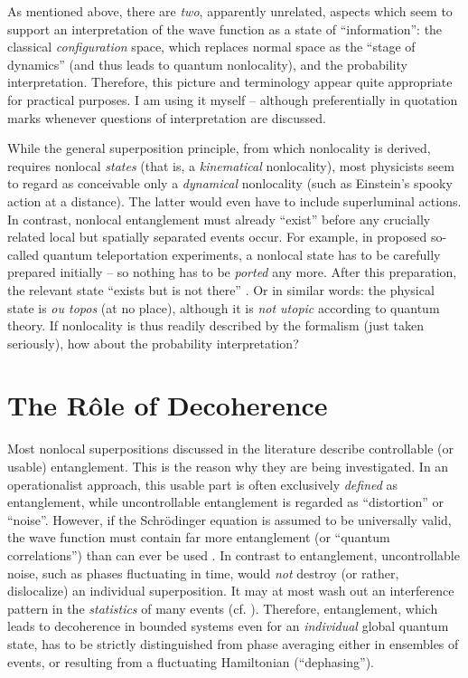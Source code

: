 As mentioned above, there are {\it two}, apparently unrelated, aspects
which seem to support an interpretation of the wave function as a state
of ``information'': the classical {\it configuration} space, which
replaces normal space as the  ``stage of dynamics'' (and
thus leads to quantum nonlocality), and the probability interpretation.
Therefore, this picture and terminology appear quite appropriate for
practical purposes.  I am using it myself -- although preferentially
in quotation marks whenever questions of interpretation are discussed.

While the general superposition principle, from which nonlocality
is derived, requires nonlocal {\it states} (that is, a {\it
kinematical} nonlocality), most physicists seem to regard as
conceivable only a {\it dynamical} nonlocality (such as Einstein's
spooky action at a distance). The latter would even have to include
superluminal actions. In contrast, nonlocal entanglement must already
``exist'' before any crucially related local but spatially separated
events occur. For example, in proposed so-called quantum teleportation
experiments, a nonlocal state has to be carefully prepared initially
-- so nothing has to be {\it ported} any more. After this preparation,
the relevant state ``exists but is not there'' \cite{JZ}. Or in similar
words: the physical state is {\it ou topos} (at no place), although it
is {\it not utopic} according to quantum theory. If nonlocality is thus
readily described by the formalism (just taken
seriously), how about the probability interpretation?

\section{The R\^ole of Decoherence}
Most nonlocal superpositions discussed in the literature
describe controllable (or usable) entanglement. This is the reason why
they are being investigated. In an operationalist approach, this
usable part is often exclusively {\it defined} as entanglement, while
uncontrollable entanglement is regarded as  ``distortion'' or
``noise''. However, if the Schr\"odinger equation is assumed to be
universally valid, the wave function must contain far more
entanglement (or ``quantum correlations'') than can ever be used
\cite{Z1970}. In contrast to entanglement, uncontrollable noise, such
as phases fluctuating in time, would {\it not} destroy (or rather,
dislocalize) an individual superposition. It may at most wash out an
interference pattern in the {\it statistics} of many events (cf.\ts
\cite{Giulini}). Therefore, entanglement, which leads to decoherence
in bounded systems even for an {\it individual} global quantum state,
has to be strictly distinguished from phase averaging either in
ensembles of events, or resulting from a fluctuating Hamiltonian
(``dephasing'').

